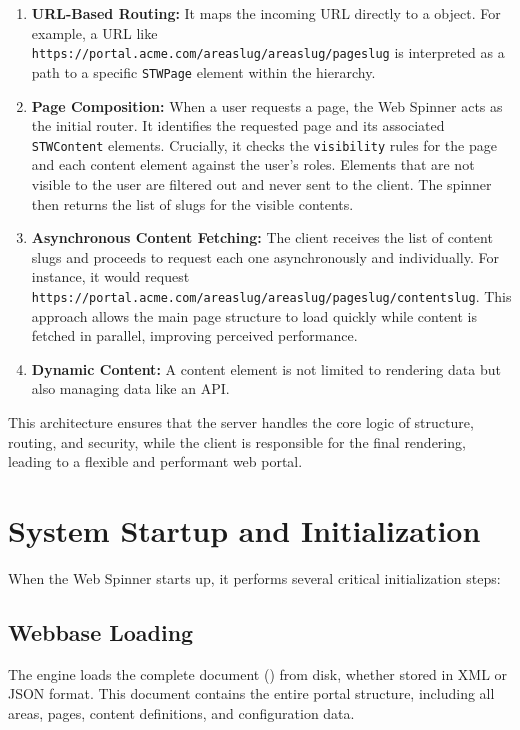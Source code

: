 \begin{enumerate}
	\item \textbf{URL-Based Routing:} It maps the incoming URL directly to a \webbase{} object. For example, a URL like \texttt{https://portal.acme.com/areaslug/areaslug/pageslug} is interpreted as a path to a specific \texttt{STWPage} element within the \webbase{} hierarchy.

	\item \textbf{Page Composition:} When a user requests a page, the Web Spinner acts as the initial router. It identifies the requested page and its associated \texttt{STWContent} elements. Crucially, it checks the \texttt{visibility} rules for the page and each content element against the user's roles. Elements that are not visible to the user are filtered out and never sent to the client. The spinner then returns the list of slugs for the visible contents.

	\item \textbf{Asynchronous Content Fetching:} The client receives the list of content slugs and proceeds to request each one asynchronously and individually. For instance, it would request \texttt{https://portal.acme.com/areaslug/areaslug/pageslug/contentslug}. This approach allows the main page structure to load quickly while content is fetched in parallel, improving perceived performance.

	\item \textbf{Dynamic Content:} A content element is not limited to rendering data but also managing data like an API.
\end{enumerate}

This architecture ensures that the server handles the core logic of structure, routing, and security, while the client is responsible for the final rendering, leading to a flexible and performant web portal.

\section{System Startup and Initialization}
\label{sec:system-startup}

When the Web Spinner starts up, it performs several critical initialization steps:

\subsection{Webbase Loading}

The engine loads the complete \wbdl{} document (\webbase{}) from disk, whether stored in XML or JSON format. This document contains the entire portal structure, including all areas, pages, content definitions, and configuration data.


